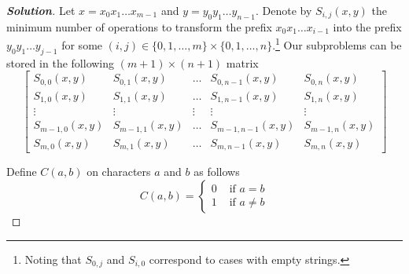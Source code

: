 \documentclass[a4paper]{article}
\newenvironment{solution}{\begin{proof}[\textnormal{\textbf{Solution}}]}{\end{proof}}
\theoremstyle{definition}
\begin{document}
\begin{solution}
 Let $x=x_0x_1\hdots x_{m-1}$ and $y=y_0y_1\hdots y_{n-1}$. Denote by $S_{i,j}(x, y)$ the minimum number of operations to transform the prefix $x_0x_1\hdots x_{i-1}$ into the prefix $y_0y_1\hdots y_{j-1}$ for some $(i, j)\in\{0,1,\hdots, m\}\times\{0, 1,\hdots, n\}$.\footnote{Noting that $S_{0,j}$ and $S_{i,0}$ correspond to cases with empty strings.} Our subproblems can be stored in the following $(m+1)\times(n+1)$ matrix 
 \[\begin{bmatrix}
S_{0,0}(x, y)&S_{0,1}(x, y)&\hdots &S_{0,n-1}(x, y)&S_{0, n}(x, y)\\
S_{1,0}(x, y)&S_{1,1}(x, y)&\hdots &S_{1,n-1}(x, y)&S_{1, n}(x, y)\\
\vdots & \vdots & \vdots & \vdots & \vdots\\
S_{m-1,0}(x, y) & S_{m-1, 1}(x, y)&\hdots  & S_{m-1, n-1}(x, y)&S_{m-1, n}(x, y)\\
S_{m,0}(x, y) & S_{m, 1}(x, y) &\hdots  & S_{m, n-1}(x, y) & S_{m, n}(x, y)
\end{bmatrix}\] 

Define $C(a, b)$ on characters $a$ and $b$ as follows
 \[C(a,b) = \begin{cases} 
       0 & \text{ if }a=b \\
       1 & \text{ if }a\neq b
   \end{cases}\]
   

\end{solution}
\end{document}

